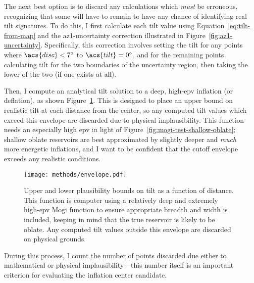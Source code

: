 The next best option is to discard any calculations which \emph{must} be erroneous, recognizing that some will have to remain to have any chance of identifying real tilt signatures. To do this, I first calculate each tilt value using Equation~\eqref{eq:tilt-from-map} and the \acs{az1}-uncertainty correction illustrated in Figure~\ref{fig:az1-uncertainty}. Specifically, this correction involves setting the tilt for any points where $\acs{disc}<\ang{7}$ to $\acs{tilt}=\ang{0}$, and for the remaining points calculating \acs{tilt} for the two boundaries of the uncertainty region, then taking the lower of the two (if one exists at all).

Then, I compute an analytical tilt solution to a deep, high-\acs{epv} inflation (or deflation), as shown Figure~\ref{fig:envelope}. This is designed to place an upper bound on realistic tilt at each distance from the center, so any computed tilt values which exceed this envelope are discarded due to physical implausibility. This function needs an especially high \acs{epv} in light of Figure~\ref{fig:mogi-test-shallow-oblate}; shallow oblate reservoirs are best approximated by slightly deeper and \emph{much} more energetic inflations, and I want to be confident that the cutoff envelope exceeds any realistic conditions.

\begin{figure}
    \texttt{[image: methods/envelope.pdf]}%
    \caption[Physically plausible tilt envelope]{Upper and lower plausibility bounds on tilt as a function of distance. This function is computer using a relatively deep and extremely high-\acs{epv} Mogi function to ensure appropriate breadth and width is included, keeping in mind that the true reservoir is likely to be oblate. Any computed tilt values outside this envelope are discarded on physical grounds.}%
    \label{fig:envelope}
\end{figure}

During this process, I count the number of points discarded due either to mathematical or physical implausibility---this number itself is an important criterion for evaluating the inflation center candidate.

